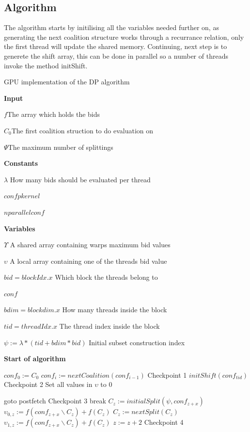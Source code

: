 \documentclass{llncs}
\begin{document}
\subsection{Algorithm} %
The algorithm starts by initilising all the variables needed further on,
as generating the next coalition structure works through a recurrance relation, 
only the first thread will update the shared memory. Continuing, next step is to generete the shift array, 
this can be done in parallel so a number of threads invoke the method initShift.
\begin{algorithm}
\caption{GPU implementation of the DP algorithm\label{gpudp}}
\textbf{Input}

$f$\hfill The array which holds the bids

$C_0$\hfill The first coalition struction to do evaluation on

$\Psi$\hfill The maximum number of splittings

\textbf{Constants}

$\lambda$ \hfill How many bids should be evaluated per thread

$confpkernel$

$nparallelconf$

\textbf{Variables} 

$\Upsilon$ \hfill A shared array containing warps maximum bid values

$\upsilon$ \hfill A local array containing one of the threads bid value

$bid = blockIdx.x$ \hfill Which block the threads belong to

$conf$

$bdim = blockdim.x$ \hfill How many threads inside the block

$tid = threadIdx.x$ \hfill The thread index inside the block

$\psi := \lambda*(tid+bdim*bid)$ \hfill Initial subset construction index

\textbf{Start of algorithm}
\begin{algorithmic}[1]
  \STATE $conf_0 := C_0$
    \STATE $conf_i := nextCoalition(conf_{i-1})$
  \ENDFOR \hfill Checkpoint 1
\ENDIF
{}
  \STATE $initShift(conf_{tid})$ 
\ENDIF
\hfill Checkpoint 2
  \STATE Set all values in $\upsilon$ to 0

  \IF{$\psi \geq \Psi$}
    \STATE goto postfetch
  \ENDIF
\hfill Checkpoint 3
      \STATE break
    \ENDIF
    \STATE $C_z := initialSplit(\psi,conf_{z+x})$
    \STATE $\upsilon_{0,z} := f(conf_{z+x}\backslash C_z)+f(C_z)$
    \STATE $C_z := nextSplit(C_z)$
    \STATE $\upsilon_{1,z} := f(conf_{z+x}\backslash C_z)+f(C_z)$
    \STATE $z := z + 2$
  \ENDFOR
\hfill Checkpoint 4
  \label{lst:line:reductionstart}
  

\end{algorithmic}
\end{algorithm}
\end{document}
